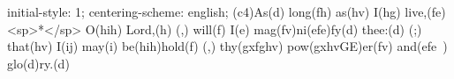 initial-style: 1;
centering-scheme: english;
(c4)As(d) long(fh) as(hv) I(hg) live,(fe) <sp>*</sp> O(hih) Lord,(h) (,) will(f) I(e) mag(fv)ni(efe)fy(d) thee:(d) (;) that(hv) I(ij) may(i) be(hih)hold(f) (,) thy(gxfghv) pow(gxhvGE)er(fv) and(efe~) glo(d)ry.(d)
